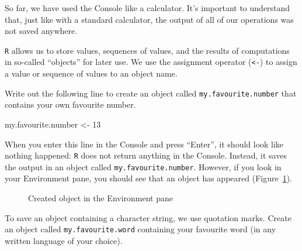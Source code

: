 \documentclass[
  letterpaper,
  DIV=11,
  numbers=noendperiod]{scrreprt}
\newenvironment{Shaded}{\begin{snugshade}}{\end{snugshade}}
\newcommand{\DecValTok}[1]{\textcolor[rgb]{0.68,0.00,0.00}{#1}}
\newcommand{\NormalTok}[1]{\textcolor[rgb]{0.00,0.23,0.31}{#1}}
\newcommand{\OtherTok}[1]{\textcolor[rgb]{0.00,0.23,0.31}{#1}}
\begin{document}
So far, we have used the Console like a calculator. It's important to
understand that, just like with a standard calculator, the output of all
of our operations was not saved anywhere.

\texttt{R} allows us to store values, sequences of values, and the
results of computations in so-called ``objects'' for later use. We use
the assignment operator (\texttt{\textless{}-}) to assign a value or
sequence of values to an object name.

Write out the following line to create an object called
\texttt{my.favourite.number} that contains your own favourite number.

\begin{Shaded}
\begin{Highlighting}[]
\NormalTok{my.favourite.number }\OtherTok{\textless{}{-}} \DecValTok{13}
\end{Highlighting}
\end{Shaded}

When you enter this line in the Console and press ``Enter'', it should
look like nothing happened: \texttt{R} does not return anything in the
Console. Instead, it saves the output in an object called
\texttt{my.favourite.number}. However, if you look in your Environment
pane, you should see that an object has appeared
(Figure~\ref{fig-ObjectCreation}).

\begin{figure}


\caption{\label{fig-ObjectCreation}Created object in the Environment
pane}

\end{figure}%

To save an object containing a character string, we use quotation marks.
Create an object called \texttt{my.favourite.word} containing your
favourite word (in any written language of your choice).
\end{document}
